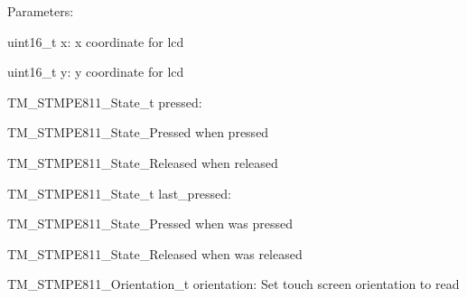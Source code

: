 Parameters\+:
\begin{DoxyItemize}
\item uint16\+\_\+t x\+: x coordinate for lcd
\item uint16\+\_\+t y\+: y coordinate for lcd
\item T\+M\+\_\+\+S\+T\+M\+P\+E811\+\_\+\+State\+\_\+t pressed\+:
\begin{DoxyItemize}
\item T\+M\+\_\+\+S\+T\+M\+P\+E811\+\_\+\+State\+\_\+\+Pressed when pressed
\item T\+M\+\_\+\+S\+T\+M\+P\+E811\+\_\+\+State\+\_\+\+Released when released
\end{DoxyItemize}
\item T\+M\+\_\+\+S\+T\+M\+P\+E811\+\_\+\+State\+\_\+t last\+\_\+pressed\+:
\begin{DoxyItemize}
\item T\+M\+\_\+\+S\+T\+M\+P\+E811\+\_\+\+State\+\_\+\+Pressed when was pressed
\item T\+M\+\_\+\+S\+T\+M\+P\+E811\+\_\+\+State\+\_\+\+Released when was released
\end{DoxyItemize}
\item T\+M\+\_\+\+S\+T\+M\+P\+E811\+\_\+\+Orientation\+\_\+t orientation\+: Set touch screen orientation to read 
\end{DoxyItemize}